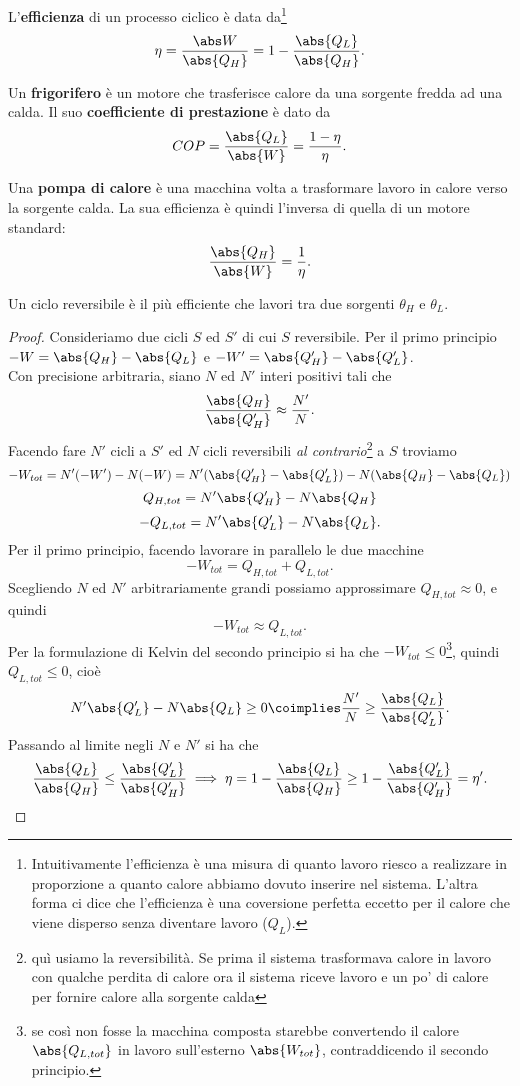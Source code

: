 \begin{definition}[Efficienza]
L'\textbf{efficienza} di un processo ciclico \`e data da\footnote{Intuitivamente l'efficienza \`e una misura di quanto lavoro riesco a realizzare in proporzione a quanto calore abbiamo dovuto inserire nel sistema. L'altra forma ci dice che l'efficienza \`e una coversione perfetta eccetto per il calore che viene disperso senza diventare lavoro ($Q_L$).}
\[\eta=\frac{\abs W}{\abs{Q_H}}=1-\frac{\abs{Q_L}}{\abs{Q_H}}.\]
\end{definition}

\begin{definition}
Un \textbf{frigorifero} \`e un motore che trasferisce calore da una sorgente fredda ad una calda. Il suo \textbf{coefficiente di prestazione} \`e dato da
\[COP=\frac{\abs{Q_L}}{\abs{W}}=\frac{1-\eta}\eta.\]
\end{definition}

\begin{definition}
Una \textbf{pompa di calore} \`e una macchina volta a trasformare lavoro in calore verso la sorgente calda. La sua efficienza \`e quindi l'inversa di quella di un motore standard:
\[\frac{\abs{Q_H}}{\abs{W}}=\frac1\eta.\]
\end{definition}

\begin{theorem}[di Carnot]\label{TeoremaDiCarnot}
Un ciclo reversibile \`e il pi\`u efficiente che lavori tra due sorgenti $\theta_H$ e $\theta_L$.
\end{theorem}
\begin{proof}
Consideriamo due cicli $S$ ed $S'$ di cui $S$ reversibile. Per il primo principio $-W=\abs{Q_H}-\abs{Q_L}$ e $-W'=\abs{Q_H'}-\abs{Q_L'}$.\\
Con precisione arbitraria, siano $N$ ed $N'$ interi positivi tali che
\[\frac{\abs{Q_H}}{\abs{Q_H'}}\approx \frac{N'}{N}.\]
Facendo fare $N'$ cicli a $S'$ ed $N$ cicli reversibili \textit{al contrario}\footnote{qu\`i usiamo la reversibilit\`a. Se prima il sistema trasformava calore in lavoro con qualche perdita di calore ora il sistema riceve lavoro e un po' di calore per fornire calore alla sorgente calda} a $S$ troviamo
\[-W_{tot}=N'(-W')-N(-W)=N'(\abs{Q_H'}-\abs{Q_L'})-N(\abs{Q_H}-\abs{Q_L})\]
\[Q_{H,tot}=N'\abs{Q_H'}-N\abs{Q_H}\]
\[-Q_{L,tot}=N'\abs{Q_L'}-N\abs{Q_L}.\]
Per il primo principio, facendo lavorare in parallelo le due macchine
\[-W_{tot}=Q_{H,tot}+Q_{L,tot}.\]
Scegliendo $N$ ed $N'$ arbitrariamente grandi possiamo approssimare $Q_{H,tot}\approx 0$, e quindi
\[-W_{tot}\approx Q_{L,tot}.\]
Per la formulazione di Kelvin del secondo principio si ha che $-W_{tot}\leq0$\footnote{se cos\`i non fosse la macchina composta starebbe convertendo il calore $\abs{Q_{L,tot}}$ in lavoro sull'esterno $\abs{W_{tot}}$, contraddicendo il secondo principio.}, quindi $Q_{L,tot}\leq 0$, cio\`e
\[N'\abs{Q_L'}-N\abs{Q_L}\geq 0\coimplies \frac{N'}N\geq \frac{\abs{Q_L}}{\abs{Q_L'}}.\]
Passando al limite negli $N$ e $N'$ si ha che
\[\frac{\abs{Q_L}}{\abs{Q_H}}\leq \frac{\abs{Q_L'}}{\abs{Q_H'}}\implies \eta=1-\frac{\abs{Q_L}}{\abs{Q_H}}\geq 1-\frac{\abs{Q_L'}}{\abs{Q_H'}}=\eta'.\]
\end{proof}

